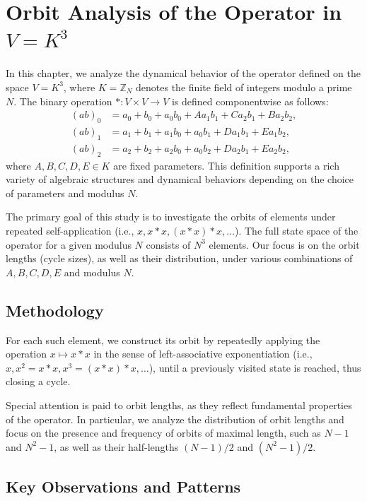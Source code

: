 \documentclass[12pt]{article}
\theoremstyle{definition}
\theoremstyle{plain}
\theoremstyle{remark}
\begin{document}
\section{Orbit Analysis of the Operator in \texorpdfstring{$V = K^3$}{V = K³}}

In this chapter, we analyze the dynamical behavior of the operator defined on the space \( V = K^3 \), where \( K = \mathbb{Z}_N \) denotes the finite field of integers modulo a prime \( N \). The binary operation \( * : V \times V \to V \) is defined componentwise as follows:
\begin{align*}
(ab)_0 &= a_0 + b_0 + a_0 b_0 + A a_1 b_1 + C a_2 b_1 + B a_2 b_2, \\
(ab)_1 &= a_1 + b_1 + a_1 b_0 + a_0 b_1 + D a_1 b_1 + E a_1 b_2, \\
(ab)_2 &= a_2 + b_2 + a_2 b_0 + a_0 b_2 + D a_2 b_1 + E a_2 b_2,
\end{align*}
where \( A, B, C, D, E \in K \) are fixed parameters. This definition supports a rich variety of algebraic structures and dynamical behaviors depending on the choice of parameters and modulus \( N \).

The primary goal of this study is to investigate the orbits of elements under repeated self-application (i.e., \( x, x*x, (x*x)*x, \dots \)). The full state space of the operator for a given modulus \( N \) consists of \( N^3 \) elements. Our focus is on the orbit lengths (cycle sizes), as well as their distribution, under various combinations of \( A, B, C, D, E \) and modulus \( N \).

\subsection{Methodology}

For each such element, we construct its orbit by repeatedly applying the operation \( x \mapsto x * x \) in the sense of left-associative exponentiation (i.e., \( x, x^2 = x * x, x^3 = (x * x) * x, \dots \)), until a previously visited state is reached, thus closing a cycle.

Special attention is paid to orbit lengths, as they reflect fundamental properties of the operator. In particular, we analyze the distribution of orbit lengths and focus on the presence and frequency of orbits of maximal length, such as \( N - 1 \) and \( N^2 - 1 \), as well as their half-lengths \( (N - 1)/2 \) and \( (N^2 - 1)/2 \).

\subsection{Key Observations and Patterns}
\end{document}
